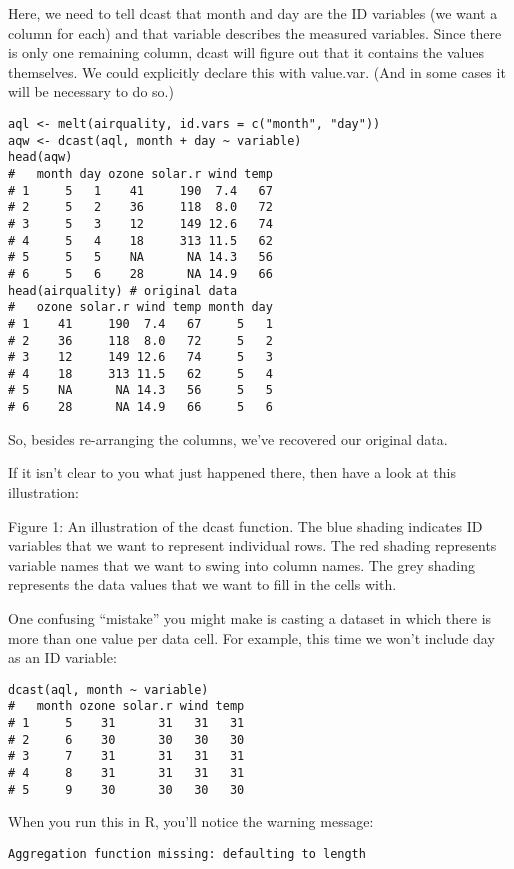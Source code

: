 \documentclass[french]{article}
\begin{document}
Here, we need to tell dcast that month and day are the ID variables (we want a column for each) and that variable describes the measured variables. Since there is only one remaining column, dcast will figure out that it contains the values themselves. We could explicitly declare this with value.var. (And in some cases it will be necessary to do so.)
\begin{framed}
\begin{verbatim}
aql <- melt(airquality, id.vars = c("month", "day"))
aqw <- dcast(aql, month + day ~ variable)
head(aqw)
#   month day ozone solar.r wind temp
# 1     5   1    41     190  7.4   67
# 2     5   2    36     118  8.0   72
# 3     5   3    12     149 12.6   74
# 4     5   4    18     313 11.5   62
# 5     5   5    NA      NA 14.3   56
# 6     5   6    28      NA 14.9   66
head(airquality) # original data
#   ozone solar.r wind temp month day
# 1    41     190  7.4   67     5   1
# 2    36     118  8.0   72     5   2
# 3    12     149 12.6   74     5   3
# 4    18     313 11.5   62     5   4
# 5    NA      NA 14.3   56     5   5
# 6    28      NA 14.9   66     5   6
\end{verbatim}
\end{framed}
So, besides re-arranging the columns, we’ve recovered our original data.

If it isn’t clear to you what just happened there, then have a look at this illustration:



Figure 1: An illustration of the dcast function. The blue shading indicates ID variables that we want to represent individual rows. The red shading represents variable names that we want to swing into column names. The grey shading represents the data values that we want to fill in the cells with.

One confusing “mistake” you might make is casting a dataset in which there is more than one value per data cell. For example, this time we won’t include day as an ID variable:
\begin{framed}
\begin{verbatim}
dcast(aql, month ~ variable)
#   month ozone solar.r wind temp
# 1     5    31      31   31   31
# 2     6    30      30   30   30
# 3     7    31      31   31   31
# 4     8    31      31   31   31
# 5     9    30      30   30   30
\end{verbatim}
\end{framed}
When you run this in R, you’ll notice the warning message:

\begin{verbatim}
Aggregation function missing: defaulting to length
\end{verbatim}
\end{document}
